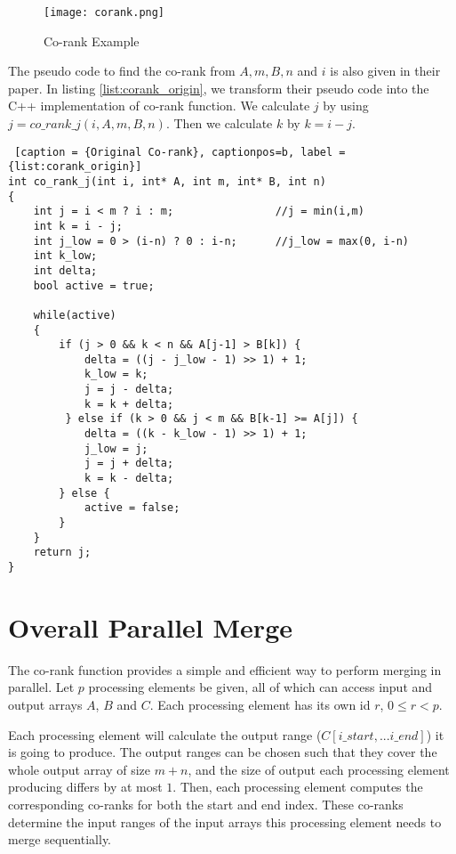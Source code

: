     \begin{figure}[!h]
    \begin{center}
    \texttt{[image: corank.png]}
    \end{center}
    \caption{{\label{fig:corank}} Co-rank Example}
    \end{figure}

    The pseudo code to find the co-rank from $A, m, B, n$ and $i$ is also given in their paper.  
    In listing \ref{list:corank_origin}, we transform their pseudo code into the C++ implementation of 
    co-rank function. We calculate
    $j$ by using $j = co\_rank\_j(i, A, m, B, n)$. Then we calculate $k$ by $k = i - j$.  

    \begin{minipage}{\linewidth}
    \begin{singlespace}
    \begin{lstlisting} [caption = {Original Co-rank}, captionpos=b, label = {list:corank_origin}]
int co_rank_j(int i, int* A, int m, int* B, int n)
{
    int j = i < m ? i : m;                //j = min(i,m)
    int k = i - j;
    int j_low = 0 > (i-n) ? 0 : i-n;      //j_low = max(0, i-n) 
    int k_low;
    int delta;
    bool active = true;

    while(active)
    {
        if (j > 0 && k < n && A[j-1] > B[k]) {
            delta = ((j - j_low - 1) >> 1) + 1;
            k_low = k;
            j = j - delta;
            k = k + delta;
         } else if (k > 0 && j < m && B[k-1] >= A[j]) {
            delta = ((k - k_low - 1) >> 1) + 1;
            j_low = j;
            j = j + delta;
            k = k - delta;
        } else {
            active = false;
        }
    }
    return j;
}
    \end{lstlisting}
    \end{singlespace}
    \end{minipage}

    \section{Overall Parallel Merge}\label{sect:overall}
    The co-rank function provides a simple and efficient way to perform merging in 
    parallel. Let $p$ processing elements be given, all of which can access input and 
    output arrays $A$, $B$ and $C$. Each processing element has its own id $r$, $0 \leq r < p$. 
    
    Each processing element will calculate the output range ($C[i\_start,...i\_end]$) it is 
    going to produce.  
    The output ranges can be chosen such that  
    they cover the whole output array of size $m + n$, and the size of output each processing
    element producing differs by at most $1$. 
    Then, each processing element computes the corresponding co-ranks for both the 
    start and end index. 
    These co-ranks determine the input ranges of the input arrays this processing element needs 
    to merge sequentially.  

